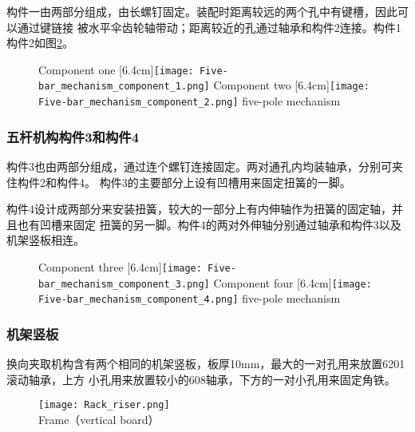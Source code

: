构件一由两部分组成，由长螺钉固定。装配时距离较远的两个孔中有键槽，因此可以通过键链接
被水平伞齿轮轴带动；距离较近的孔通过轴承和构件2连接。构件1构件2如图\ref{fig:bisubcaptionbox}。

\begin{figure}[!hbtp]
  \centering
                  {Component one}%
                  [6.4cm]{\texttt{[image: Five-bar\_mechanism\_component\_1.png]}}
  \hspace{1cm}
                  {Component two}%
                  [6.4cm]{\texttt{[image: Five-bar\_mechanism\_component\_2.png]}}
            {five-pole mechanism}
  \label{fig:bisubcaptionbox}
\end{figure}


\subsubsection{五杆机构构件3和构件4}

构件3也由两部分组成，通过连个螺钉连接固定。两对通孔内均装轴承，分别可夹住构件2和构件4。
构件3的主要部分上设有凹槽用来固定扭簧的一脚。

构件4设计成两部分来安装扭簧，较大的一部分上有内伸轴作为扭簧的固定轴，并且也有凹槽来固定
扭簧的另一脚。构件4的两对外伸轴分别通过轴承和构件3以及机架竖板相连。

\begin{figure}[!hbtp]
  \centering
                  {Component three}%
                  [6.4cm]{\texttt{[image: Five-bar\_mechanism\_component\_3.png]}}
  \hspace{1cm}
                  {Component four}%
                  [6.4cm]{\texttt{[image: Five-bar\_mechanism\_component\_4.png]}}
            {five-pole mechanism}
  \label{fig:bisubcaptionbox}
\end{figure}

\subsubsection{机架竖板}

换向夹取机构含有两个相同的机架竖板，板厚10mm，最大的一对孔用来放置6201滚动轴承，上方
小孔用来放置较小的608轴承，下方的一对小孔用来固定角铁。

\begin{figure}[!htp]
  \centering
  \texttt{[image: Rack\_riser.png]} \\
    {Frame（vertical board）}
  \label{fig:机架竖板}
\end{figure}

